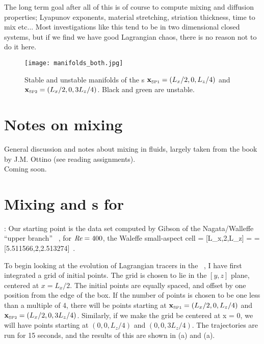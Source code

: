 The long term goal after all of this is of course to compute mixing
and diffusion properties; Lyapunov exponents, material stretching,
striation thickness, time to mix etc... Most investigations like
this tend to be in two dimensional closed systems, but if we find we
have good Lagrangian chaos, there is no reason not to do it here.

\begin{figure}[!h]
\texttt{[image: manifolds\_both.jpg]}
  \caption{
   Stable and unstable manifolds of the \stagp s
   ${{\bf x}_{\text{\tiny SP1}}} = (L_x/2,0,L_z/4)$ and
   ${{\bf x}_{\text{\tiny SP2}}} = (L_x/2,0,3L_z/4)$. Black and green are unstable.
   }
  \label{eltonFig:manifolds_both}
 \end{figure}


\section{Notes on mixing}

General discussion and notes about mixing in fluids, largely taken
from the book by J.M. Ottino (see reading assignments). \\

Coming soon.


\section{Mixing and \stagp s for \tUB}

: Our starting point is the data
set computed by Gibson of the Nagata/Walleffe
``upper branch'' \eqv\ \tUB, for $\textit{Re} = 400$, the
Waleffe small-aspect cell \beq \bNarrow =  [L_x,2,L_z]
         = \; [2\pi/1.14,2,4\pi/5]
         = [5.511566,2,2.513274]
\,.
\label{cellW03}
\eeq

To begin looking at the evolution of Lagrangian tracers in the
\eqv\ \tUB, I have first integrated a grid of initial points. The grid
is chosen to lie in the $[y,z]$ plane, centered at $x = L_x/2$. The initial
points are equally spaced, and offset by one position from the edge
of the box. If the number of points is chosen to be one less than a
multiple of 4, there will be points starting at ${{\bf x}_{\text{\tiny SP1}}}=(L_x/2,0,L_z/4)$ and
${{\bf x}_{\text{\tiny SP2}}}=(L_x/2,0,3L_z/4)$. Similarly, if we make the grid be centered at x = 0,
we will have points starting at $(0,0,L_z/4)$ and $(0,0,3L_z/4)$. The
trajectories are run for 15 seconds, and the results of this are
shown in \;(a) and \;(a).


